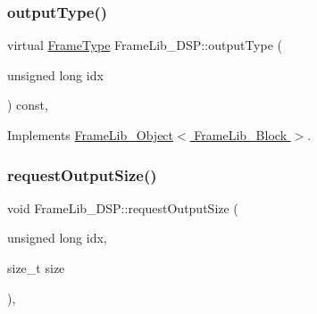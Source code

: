 \mbox{\label{class_frame_lib___d_s_p_a17b4529624dd9219d502570f81d88b27}} 
\subsubsection{\texorpdfstring{output\+Type()}{outputType()}}
{\footnotesize\ttfamily virtual \hyperlink{_frame_lib___types_8h_ad495a9f61af7fff07d7e97979d1ab854}{Frame\+Type} Frame\+Lib\+\_\+\+D\+S\+P\+::output\+Type (\begin{DoxyParamCaption}\item[{unsigned long}]{idx }\end{DoxyParamCaption}) const\hspace{0.3cm}{\ttfamily [inline]}, {\ttfamily [virtual]}}



Implements \hyperlink{class_frame_lib___object_a03eb408844f15d8f73cee67f43149b9d}{Frame\+Lib\+\_\+\+Object$<$ Frame\+Lib\+\_\+\+Block $>$}.

\mbox{\label{class_frame_lib___d_s_p_a018be5346f473c3c21d5251d6acb85c7}} 
\subsubsection{\texorpdfstring{request\+Output\+Size()}{requestOutputSize()}}
{\footnotesize\ttfamily void Frame\+Lib\+\_\+\+D\+S\+P\+::request\+Output\+Size (\begin{DoxyParamCaption}\item[{unsigned long}]{idx,  }\item[{size\+\_\+t}]{size }\end{DoxyParamCaption})\hspace{0.3cm}{\ttfamily [inline]}, {\ttfamily [protected]}}

\mbox{\label{class_frame_lib___d_s_p_ad253c096a1c7cc236804dfd1f2e650ec}} 
